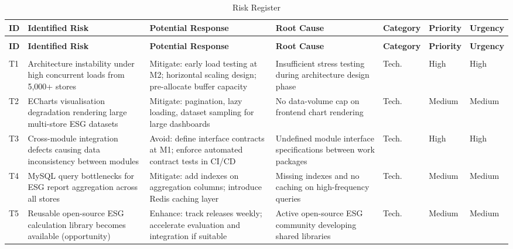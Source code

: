 \documentclass[12pt,a4paper]{article}
\begin{document}
{\footnotesize\setlength{\tabcolsep}{3pt}
\begin{longtable}{@{}>{\centering\arraybackslash}p{0.5cm}>{\raggedright\arraybackslash}p{3.1cm}>{\raggedright\arraybackslash}p{3.3cm}>{\raggedright\arraybackslash}p{2.6cm}>{\centering\arraybackslash}p{1.3cm}>{\centering\arraybackslash}p{1.2cm}>{\centering\arraybackslash}p{1.2cm}@{}}
\caption{Risk Register}\label{tab:risk_register}\\
\toprule
\textbf{ID} & \textbf{Identified Risk} & \textbf{Potential Response} & \textbf{Root Cause} & \textbf{Cate\-gory} & \textbf{Prio\-rity} & \textbf{Ur\-gency} \\
\midrule
\endfirsthead
\multicolumn{7}{l}{\footnotesize\textit{(Continued from previous page)}}\\
\toprule
\textbf{ID} & \textbf{Identified Risk} & \textbf{Potential Response} & \textbf{Root Cause} & \textbf{Cate\-gory} & \textbf{Prio\-rity} & \textbf{Ur\-gency} \\
\midrule
\endhead
\midrule
\multicolumn{7}{r}{\footnotesize\textit{(Continued on next page)}}\\
\endfoot
\bottomrule
\endlastfoot
T1 & Architecture instability under high concurrent loads from 5{,}000+ stores & Mitigate: early load testing at M2; horizontal scaling design; pre-allocate buffer capacity & Insufficient stress testing during architecture design phase & Tech. & High & High \\
T2 & ECharts visualisation degradation rendering large multi-store ESG datasets & Mitigate: pagination, lazy loading, dataset sampling for large dashboards & No data-volume cap on frontend chart rendering & Tech. & Medium & Medium \\
T3 & Cross-module integration defects causing data inconsistency between modules & Avoid: define interface contracts at M1; enforce automated contract tests in CI/CD & Undefined module interface specifications between work packages & Tech. & High & High \\
T4 & MySQL query bottlenecks for ESG report aggregation across all stores & Mitigate: add indexes on aggregation columns; introduce Redis caching layer & Missing indexes and no caching on high-frequency queries & Tech. & Medium & Medium \\
T5 & Reusable open-source ESG calculation library becomes available (opportunity) & Enhance: track releases weekly; accelerate evaluation and integration if suitable & Active open-source ESG community developing shared libraries & Tech. & Medium & Medium \\

\end{longtable}}
\end{document}
